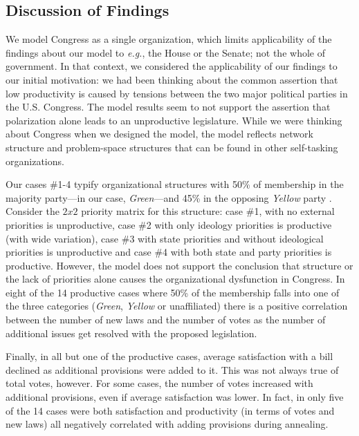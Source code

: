 \documentclass[pdftex,12pt]{llncs}
\begin{document}
\subsection{Discussion of Findings}
We model Congress as a single organization, which limits applicability of the findings about our model to \textit{e.g.}, the House or the Senate; not the whole of government.
In that context, we considered the applicability of our findings to our initial motivation: we had been thinking about the common assertion that low productivity is caused by tensions between the two major political parties in the U.S. Congress.  
The model results seem to not support the assertion that polarization alone leads to an unproductive legislature. 
While we were thinking about Congress when we designed the model, the model reflects network structure and problem-space structures that can be found in other self-tasking organizations.

Our cases \#1-4 typify organizational structures with 50\% of membership in the majority party---in our case, \textit{Green}---and 45\% in the opposing \textit{Yellow} party .
Consider the $2 x 2$ priority matrix for this structure: case \#1, with no external priorities is unproductive, case \#2 with only ideology priorities is productive (with wide variation), case \#3 with state priorities and without ideological priorities is unproductive and case \#4 with both state and party priorities is productive. 
However, the model does not support the conclusion that structure or the lack of priorities alone causes the organizational dysfunction in Congress.
In eight of the 14 productive cases where 50\% of the membership falls into one of the three categories (\textit{Green}, \textit{Yellow} or unaffiliated) there is a positive correlation between the number of new laws and the number of votes as the number of additional issues get resolved with the proposed legislation.   

Finally, in all but one of the productive cases, average satisfaction with a bill declined as additional provisions were added to it. 
This was not always true of total votes, however.
For some cases, the number of votes increased with additional provisions, even if average satisfaction was lower. 
In fact, in only five of the 14 cases were both satisfaction and productivity (in terms of votes and new laws) all negatively correlated with adding provisions during annealing. 
 
\end{document}
